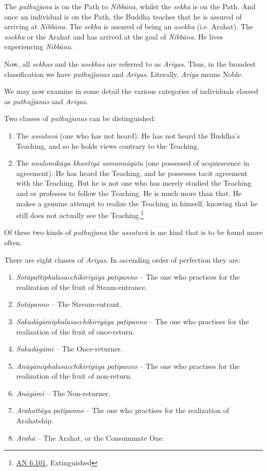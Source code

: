 The \emph{puthujjana} is  on the Path to \emph{Nibbāna}, whilst the \emph{sekha} is on the Path. And once an individual is on the Path, the Buddha teaches that he is assured of arriving at \emph{Nibbāna}. The \emph{sekha} is assured of being an \emph{asekha} (i.e. Arahat). The \emph{asekha} or the Arahat  and has arrived at the goal of \emph{Nibbāna}. He lives experiencing \emph{Nibbāna}.

Now, all \emph{sekhas} and the \emph{asekhas} are referred to as \emph{Ariyas}. Thus, in the broadest classification we have \emph{puthujjanas} and \emph{Ariyas}. Literally, \emph{Ariya} means Noble.

We may now examine in some detail the various categories of individuals classed as \emph{puthujjanas} and \emph{Ariyas}.

Two classes of \emph{puthujjanas} can be distinguished:

\begin{enumerate}
\def\labelenumi{\arabic{enumi}.}
\item
  The \emph{assutavā} (one who has not heard). He has not heard the Buddha's Teaching, and so he holds views contrary to the Teaching.
\item
  The \emph{anulomikāya khantiyā samannāgata} (one possessed of acquiescence in agreement). He has heard the Teaching, and he possesses tacit agreement with the Teaching. But he is not one who has merely studied the Teaching and or professes to follow the Teaching. He is much more than that. He makes a genuine attempt to realize the Teaching in himself, knowing that he still does not actually see the Teaching.\footnote{\href{https://suttacentral.net/an6.101/en/sujato}{AN 6.101}, Extinguished}
\end{enumerate}

Of these two kinds of \emph{puthujjana} the \emph{assutavā} is me kind that is to be found more often.

There are eight classes of \emph{Ariyas}. In ascending order of perfection they are:

\begin{enumerate}
\def\labelenumi{\arabic{enumi}.}
\item
  \emph{Sotāpattiphalasacchikiriyāya paṭipanno} -- The one who practices for the realization of the fruit of Steam-entrance.
\item
  \emph{Sotāpanno} -- The Stream-entrant.
\item
  \emph{Sakadāgāmiphalasacchikiriyāya paṭipanno} -- The one who practises for the realization of the fruit of once-return.
\item
  \emph{Sakadāgāmi} -- The Once-returner.
\item
  \emph{Anāgāmiphalasacchikiriyāya paṭipanno} -- The one who practises for the realization of the fruit of non-return.
\item
  \emph{Anāgāmi} -- The Non-returner.
\item
  \emph{Arahattāya paṭipanno} -- The one who practises for the realization of Arahatship.
\item
  \emph{Arahā} -- The Arahat, or the Consummate One.
\end{enumerate}

